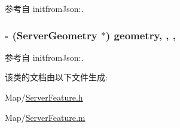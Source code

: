 参考自 initfrom\-Json\-:.

\hypertarget{interface_server_feature_a74fe7abe2c894199e12d576c3adeadea}{
\subsubsection[{geometry}]{\setlength{\rightskip}{0pt plus 5cm}-\/ ({\bf Server\-Geometry} $\ast$) geometry\hspace{0.3cm}{\ttfamily [read]}, {\ttfamily [write]}, {\ttfamily [atomic]}, {\ttfamily [retain]}}}\label{interface_server_feature_a74fe7abe2c894199e12d576c3adeadea}


参考自 initfrom\-Json\-:.



该类的文档由以下文件生成\-:\begin{DoxyCompactItemize}
\item 
Map/\hyperlink{_server_feature_8h}{Server\-Feature.\-h}\item 
Map/\hyperlink{_server_feature_8m}{Server\-Feature.\-m}\end{DoxyCompactItemize}
